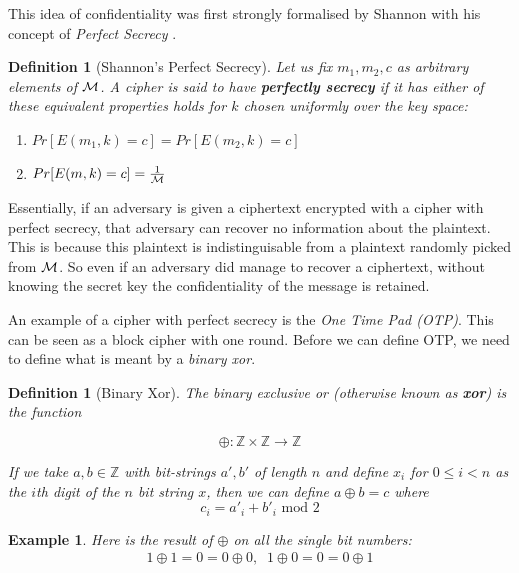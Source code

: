 \documentclass[12pt,a4paper]{article}
\newtheorem{definition}[theorem]{Definition}
\newtheorem{example}[theorem]{Example}
\begin{document}
This idea of confidentiality was first strongly formalised by
Shannon with his concept of \textit{Perfect Secrecy} \cite{shannon1949communication}. 

\begin{definition}[Shannon's Perfect Secrecy]
Let us fix $m_1,m_2,c$ as arbitrary elements of $\cal{M}$. A cipher is said to have
\textbf{perfectly secrecy} if it has either of these equivalent properties
holds for $k$ chosen uniformly over the key space:

\begin{enumerate}
    \item $Pr[E(m_1,k)=c] = Pr[E(m_2,k)=c]$
    \item $Pr[E(m,k)=c]= \frac{1}{\cal{M}}$
\end{enumerate}
\end{definition}

Essentially, if an adversary is given a ciphertext encrypted with a cipher with
perfect secrecy, that adversary can recover no information about the plaintext.
This is because this plaintext is indistinguisable from a plaintext randomly
picked from $\cal{M}$. So even if an adversary did manage to recover a
ciphertext, without knowing the secret key the confidentiality of the message
is retained.

An example of a cipher with perfect secrecy is the \textit{One Time Pad (OTP)}. This can
be seen as a block cipher with one round.  Before we can define OTP, we need to
define what is meant by a \textit{binary xor}.

\begin{definition}[Binary Xor]
\label{def:xor}
The binary exclusive or (otherwise known as \textbf{xor}) is the function

\[\oplus:\mathbb{Z}\times\mathbb{Z} \rightarrow \mathbb{Z}\]

 If we take $a,b \in
\mathbb{Z}$ with bit-strings $a',b'$ of length $n$ and define $x_i$ for $0
\leq i < n$ as the $i$th digit of the $n$ bit string $x$, then we can define
$a \oplus b = c$ where
\[c_i = a'_i + b'_i \mbox{ mod } 2\]
\end{definition}

\begin{example}
Here is the result of $\oplus$ on all the single bit numbers:
\begin{align} 
\label{eq:xor}
1 \oplus 1 = 0 = 0 \oplus 0, \;\; 1 \oplus 0 = 0 = 0 \oplus 1
\end{align}
\end{example}
\end{document}
